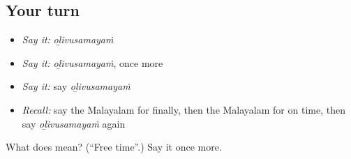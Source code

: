 \subsection*{Your turn}
\begin{itemize}
\raggedright
  \item \emph{Say it:} \emph{oḻivusamayaṁ}
  \item \emph{Say it:} \emph{oḻivusamayaṁ}, once more
  \item \emph{Say it:} say \emph{oḻivusamayaṁ}
  \item \emph{Recall:} say the Malayalam for finally, then the Malayalam for on time, then say \emph{oḻivusamayaṁ} again
\end{itemize}

\begin{tcolorbox}[breakable,colback=teal!4,colframe=teal!35!black,title={Before you move on}]
What does  mean? (\textquotedblleft{}Free time\textquotedblright{}.) Say it once more.
\end{tcolorbox}
